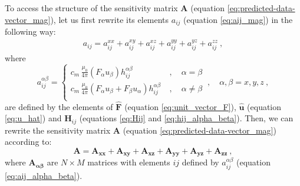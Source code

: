 \documentclass[manuscript]{geophysics}
\begin{document}
	To access the structure of the sensitivity matrix $\mathbf{A}$ 
	(equation \ref{eq:predicted-data-vector_mag}), let us first rewrite its elements 
	$a_{ij}$ (equation \ref{eq:aij_mag}) in the following way:
	\begin{equation}
		\begin{split}
			a_{ij} = a^{xx}_{ij} + a^{xy}_{ij} + a^{xz}_{ij} + a^{yy}_{ij} + a^{yz}_{ij} + a^{zz}_{ij} \: ,
		\end{split}
		\label{eq:aij_mag_expand}
	\end{equation}
	where
	\begin{equation}
		a^{\alpha\beta}_{ij} = 
		\begin{cases}
			c_{m} \, \frac{\mu_{0}}{4\pi} 
			\left( F_{\alpha} u_{\beta} \right) h^{\alpha\beta}_{ij} \: &, \quad \alpha = \beta \\
			c_{m} \, \frac{\mu_{0}}{4\pi} 
			\left( F_{\alpha} u_{\beta} + F_{\beta} u_{\alpha} \right) h^{\alpha\beta}_{ij} \: &, \quad \alpha \ne \beta \\
		\end{cases}
		\: , \quad \alpha, \beta = x, y, z \: ,
		\label{eq:aij_alpha_beta}
	\end{equation}
	are defined by the elements of $\hat{\mathbf{F}}$ 
	(equation \ref{eq:unit_vector_F}), $\hat{\mathbf{u}}$ (equation \ref{eq:u_hat}) and 
	$\mathbf{H}_{ij}$ (equations \ref{eq:Hij} and \ref{eq:hij_alpha_beta}).
	Then, we can rewrite the sensitivity matrix $\mathbf{A}$ 
	(equation \ref{eq:predicted-data-vector_mag}) according to:
	\begin{equation}
		\mathbf{A} = \mathbf{A_{xx}} + \mathbf{A_{xy}} + \mathbf{A_{xz}} + 
		\mathbf{A_{yy}} + \mathbf{A_{yz}} + \mathbf{A_{zz}} \: ,
		\label{eq:A_expand}
	\end{equation}
	where $\mathbf{A_{\boldsymbol{\alpha\beta}}}$ are $N \times M$ matrices with elements 
	$ij$ defined by $a^{\alpha\beta}_{ij}$ (equation \ref{eq:aij_alpha_beta}).
	
\end{document}
